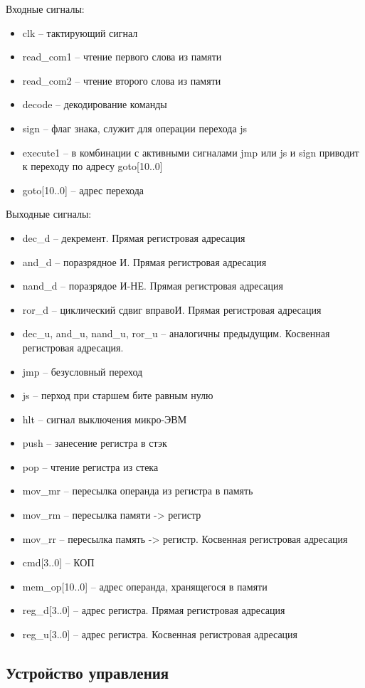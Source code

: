 Входные сигналы:
\begin{itemize}
    \item clk -- тактирующий сигнал
    \item read\_com1 -- чтение первого слова из памяти
    \item read\_com2 -- чтение второго слова из памяти
    \item decode -- декодирование команды
    \item sign -- флаг знака, служит для операции перехода js
    \item execute1 -- в комбинации с активными сигналами jmp или js и sign приводит к переходу по адресу goto[10..0]
    \item goto[10..0] -- адрес перехода
\end{itemize}
Выходные сигналы:
\begin{itemize}
    \item dec\_d -- декремент. Прямая регистровая адресация
    \item and\_d -- поразрядное И. Прямая регистровая адресация
    \item nand\_d -- поразрядое И-НЕ. Прямая регистровая адресация
    \item ror\_d -- циклический сдвиг вправоИ. Прямая регистровая адресация
    \item dec\_u, and\_u, nand\_u, ror\_u -- аналогичны предыдущим. Косвенная регистровая адресация.
    \item jmp -- безусловный переход
    \item js -- перход при старшем бите равным нулю
    \item hlt -- сигнал выключения микро-ЭВМ
    \item push -- занесение регистра в стэк
    \item pop -- чтение регистра из стека
    \item mov\_mr -- пересылка операнда из регистра в память
    \item mov\_rm -- пересылка памяти -> регистр
    \item mov\_rr -- пересылка память -> регистр. Косвенная регистровая адресация
    \item cmd[3..0] -- КОП
    \item mem\_op[10..0] -- адрес операнда, хранящегося в памяти
    \item reg\_d[3..0] -- адрес регистра. Прямая регистровая адресация
    \item reg\_u[3..0] -- адрес регистра. Косвенная регистровая адресация
\end{itemize}



\subsection{Устройство управления}
